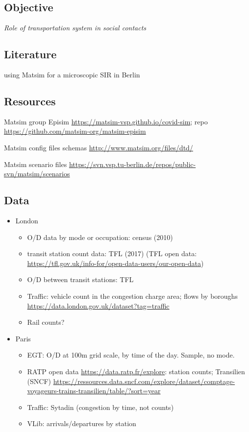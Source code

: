 \documentclass[10pt]{article}
\begin{document}
\cite{leung2021real}

\subsection{Objective}

\textit{Role of transportation system in social contacts}

\subsection{Literature}

\cite{11303_10945} using Matsim for a microscopic SIR in Berlin

\subsection{Resources}

Matsim group Episim \url{https://matsim-vsp.github.io/covid-sim}; repo \url{https://github.com/matsim-org/matsim-episim}

Matsim config files schemas \url{http://www.matsim.org/files/dtd/}

Matsim scenario files \url{https://svn.vsp.tu-berlin.de/repos/public-svn/matsim/scenarios}
	
\subsection{Data}

\begin{itemize}
	\item London
	\begin{itemize}
		\item O/D data by mode or occupation: census (2010)
		\item transit station count data: TFL (2017) (TFL open data: \url{https://tfl.gov.uk/info-for/open-data-users/our-open-data})
		\item O/D between transit stations: TFL
		\item Traffic: vehicle count in the congestion charge area; flows by boroughs \url{https://data.london.gov.uk/dataset?tag=traffic}
		\item Rail counts?
	\end{itemize}
	\item Paris
	\begin{itemize}
		\item EGT: O/D at 100m grid scale, by time of the day. Sample, no mode.
		\item RATP open data \url{https://data.ratp.fr/explore}: station counts; Transilien (SNCF) \url{https://ressources.data.sncf.com/explore/dataset/comptage-voyageurs-trains-transilien/table/?sort=year}
		\item Traffic: Sytadin (congestion by time, not counts)
		\item VLib: arrivals/departures by station
	\end{itemize}
\end{itemize}
\end{document}
